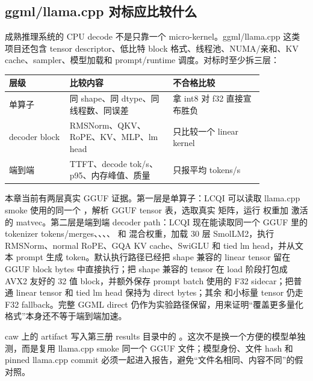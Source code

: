 \subsection{ggml/llama.cpp 对标应比较什么}

成熟推理系统的 CPU decode 不是只靠一个 micro-kernel。ggml/llama.cpp 这类项目还包含 tensor descriptor、低比特 block 格式、线程池、NUMA/亲和、KV cache、sampler、模型加载和 prompt/runtime 调度。对标时至少拆三层：

\begin{center}
\begin{tabular}{p{0.20\linewidth}p{0.34\linewidth}p{0.30\linewidth}}
\toprule
层级 & 比较内容 & 不合格比较 \\
\midrule
单算子 & 同 shape、同 dtype、同线程数、同误差 & 拿 int8 对 f32 直接宣布胜负 \\
decoder block & RMSNorm、QKV、RoPE、KV、MLP、lm head & 只比较一个 linear kernel \\
端到端 & TTFT、decode tok/s、p95、内存峰值、质量 & 只报平均 tokens/s \\
\bottomrule
\end{tabular}
\end{center}

本章当前有两层真实 GGUF 证据。第一层是单算子：LCQI 可以读取 llama.cpp smoke 使用的同一个 ，解析 GGUF tensor 表，选取真实  矩阵，运行  权重加  激活的 matvec。第二层是端到端 decoder path：LCQI 现在能读取同一个 GGUF 里的 tokenizer tokens/merges、、、、 和  混合权重，加载 30 层 SmolLM2，执行 RMSNorm、normal RoPE、GQA KV cache、SwiGLU 和 tied lm head，并从文本 prompt 生成 token。默认执行路径已经把 shape 兼容的  linear tensor 留在 GGUF block bytes 中直接执行；把 shape 兼容的  tensor 在 load 阶段打包成 AVX2 友好的 32 值 block，并额外保存 prompt batch 使用的 F32 sidecar；把普通  linear tensor 和 tied  lm head 保持为 direct bytes；其余  和小标量 tensor 仍走 F32 fallback。完整  GGML direct 仍作为实验路径保留，用来证明“覆盖更多量化格式”本身还不等于端到端加速。

caw 上的 artifact 写入第三册 results 目录中的 。这次不是换一个方便的模型单独测，而是复用 llama.cpp smoke 同一个 GGUF 文件；模型身份、文件 hash 和 pinned llama.cpp commit 必须一起进入报告，避免“文件名相同、内容不同”的假对照。

